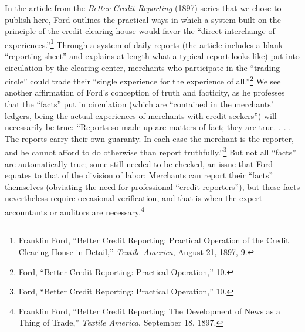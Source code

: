 \documentclass[twoside,symmetric,nobib,justified]{tufte-book}
\begin{document}
In the article from the \emph{Better Credit Reporting} (1897) series
that we chose to publish here, Ford outlines the practical ways in which
a system built on the principle of the credit clearing house would favor
the ``direct interchange of experiences.''\footnote{Franklin Ford,
  ``Better Credit Reporting: Practical Operation of the Credit
  Clearing-House in Detail,'' \emph{Textile America}, August 21, 1897,
  9.} Through a system of daily reports (the article includes a blank
``reporting sheet'' and explains at length what a typical report looks
like) put into circulation by the clearing center, merchants who
participate in the ``trading circle'' could trade their ``single
experience for the experience of all.''\footnote{Ford, ``Better Credit
  Reporting: Practical Operation,'' 10.} We see another affirmation of
Ford's conception of truth and facticity, as he professes that the
``facts'' put in circulation (which are ``contained in the merchants'
ledgers, being the actual experiences of merchants with credit
seekers'') will necessarily be true: ``Reports so made up are matters of
fact; they are true. . . . The reports carry their own guaranty. In each
case the merchant is the reporter, and he cannot afford to do otherwise
than report truthfully.''\footnote{Ford, ``Better Credit Reporting:
  Practical Operation,'' 10.} But not all ``facts'' are automatically
true; some still needed to be checked, an issue that Ford equates to
that of the division of labor: Merchants can report their ``facts''
themselves (obviating the need for professional ``credit reporters''),
but these facts nevertheless require occasional verification, and that
is when the expert accountants or auditors are necessary.\footnote{Franklin
  Ford, ``Better Credit Reporting: The Development of News as a Thing of
  Trade,'' \emph{Textile America}, September 18, 1897.}
\end{document}
